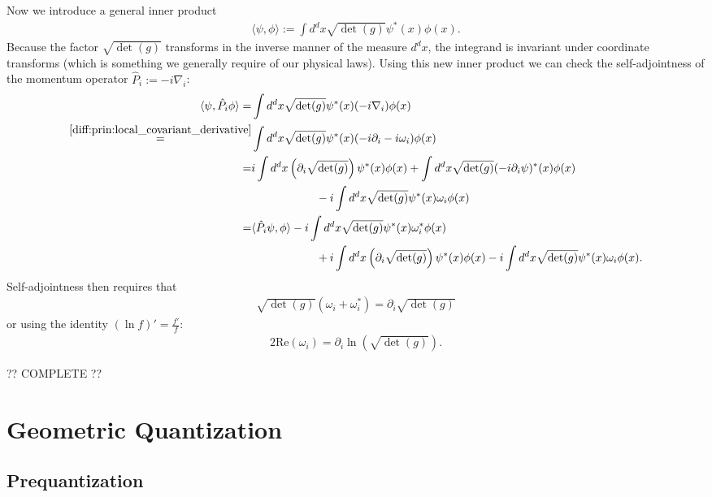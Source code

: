 \begin{construct}
        Now we introduce a general inner product
        \begin{gather}
            \langle\psi, \phi\rangle := \int d^dx\sqrt{\det(g)}\psi^*(x)\phi(x).
        \end{gather}
        Because the factor $\sqrt{\det(g)}$ transforms in the inverse manner of the measure $d^dx$, the integrand is invariant under coordinate transforms (which is something we generally require of our physical laws). Using this new inner product we can check the self-adjointness of the momentum operator $\hat{P}_i := -i\nabla_i$:
        \begin{align*}
            \langle\psi, \hat{P}_i\phi\rangle = &\int d^dx\sqrt{\det(g)}\psi^*(x)(-i\nabla_i)\phi(x)\\
            \overset{\ref{diff:prin:local_covariant_derivative}}{=} &\int d^dx\sqrt{\det(g)}\psi^*(x)(-i\partial_i - i\omega_i)\phi(x)\\
            = &i\int d^dx\left(\partial_i\sqrt{\det(g)}\right)\psi^*(x)\phi(x) + \int d^dx\sqrt{\det(g)}(-i\partial_i\psi)^*(x)\phi(x)\\
                &\hspace{2cm} -i \int d^dx\sqrt{\det(g)}\psi^*(x)\omega_i\phi(x)\\
            = &\langle\hat{P}_i\psi, \phi\rangle -i \int d^dx\sqrt{\det(g)}\psi^*(x)\omega_i^*\phi(x)\\
                &\hspace{2cm} + i\int d^dx\left(\partial_i\sqrt{\det(g)}\right)\psi^*(x)\phi(x) -i \int d^dx\sqrt{\det(g)}\psi^*(x)\omega_i\phi(x).
        \end{align*}
        Self-adjointness then requires that
        \begin{gather}
            \sqrt{\det(g)}(\omega_i + \omega_i^*) = \partial_i\sqrt{\det(g)}
        \end{gather}
        or using the identity $(\ln f)' = \frac{f'}{f}$:
        \begin{gather}
            2\text{Re}(\omega_i) = \partial_i\ln\left(\sqrt{\det(g)}\right).
        \end{gather}
    \end{construct}

    ?? COMPLETE ??

\section{Geometric Quantization}\label{section:geometric_quantization}
\subsection{Prequantization}

